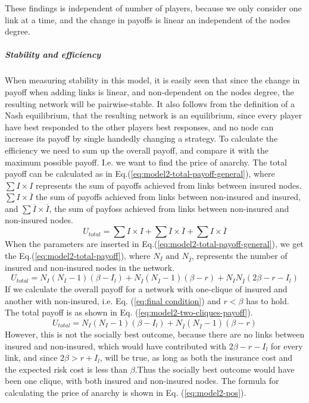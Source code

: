 These findings is independent of number of players, because we only consider one link at a time, and the change in payoffs is linear an independent of the nodes degree.
\subparagraph{Stability and efficiency}
When measuring stability in this model, it is easily seen that since the change in payoff when adding links is linear, and non-dependent on the nodes degree, the resulting network will be pairwise-stable. It also follows from the definition of a Nash equilibrium, that the resulting network is an equilibrium, since every player have best responded to the other players best responses, and no node can increase its payoff by single handedly changing a strategy. 
To calculate the efficiency we need to sum up the overall payoff, and compare it with the maximum possible payoff. I.e. we want to find the price of anarchy. The total payoff can be calculated as in Eq.(\ref{eq:model2-total-payoff-general}), where $\sum I \times I$ represents the sum of payoffs achieved from links between insured nodes. $\sum I \times \overline{I}$ the sum of payoffs achieved from links between non-insured and insured, and $\sum \overline{I} \times \overline{I}$, the sum of payfoss achieved from links between non-insured and non-insured nodes. 
\begin{equation}
U_{total}=\sum I \times I+\sum \overline{I}\times\overline{I}+\sum I\times\overline{I}
\label{eq:model2-total-payoff-general}
\end{equation}
When the parameters are inserted in Eq.(\ref{eq:model2-total-payoff-general}), we get the Eq.(\ref{eq:model2-total-payoff}), where $N_{I} \text{ and } N_{\overline{I}}$, represents the number of insured and non-insured nodes in the network.
\begin{equation}
U_{total}=N_{I}(N_{I}-1)(\beta-I_{l})+N_{\overline{I}}(N_{\overline{I}}-1)(\beta-r)+N_{I}N_{\overline{I}}(2\beta-r-I_{l})
\label{eq:model2-total-payoff}
\end{equation}
If we calculate the overall payoff for a network with one-clique of insured and another with non-insured, i.e. Eq. (\ref{eq:final condition}) and $r<\beta$ has to hold. The total payoff is as shown in Eq. (\ref{eq:model2-two-cliques-payoff}).
\begin{equation}
U_{total}=N_{I}(N_{I}-1)(\beta-I_{l})+N_{\overline{I}}(N_{\overline{I}}-1)(\beta-r)
\label{eq:model2-two-cliques-payoff}
\end{equation}
However, this is not the socially best outcome, because there are no links between insured and non-insured, which would have contributed with $2\beta-r-I_{l}$ for every link, and since $2\beta>r+I_{l}$, will be true, as long as both the insurance cost and the expected risk cost is less than $\beta$.Thus the socially best outcome would have been one clique, with both insured and non-insured nodes. The formula for calculating the price of anarchy is shown in Eq. (\ref{eq:model2-pos}).
